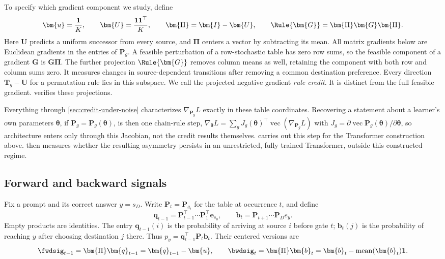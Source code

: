 To specify which gradient component we study, define
\begin{equation}
 \bm{u}=\frac{\mathbf1}{K},\qquad \bm{U}=\frac{\mathbf1\mathbf1^\top}{K},\qquad
 \bm{\Pi}=\bm{I}-\bm{U},\qquad \Rule{\bm{G}}=\bm{\Pi} \bm{G}\bm{\Pi} .
 \label{eq:credit-coordinates}
\end{equation}
Here $\bm{U}$ predicts a uniform successor from every source, and $\bm{\Pi}$ centers a
vector by subtracting its mean. All matrix gradients below are Euclidean
gradients in the entries of $\bm{P}_g$. A feasible perturbation of a row-stochastic
table has zero row sums, so the feasible component of a gradient $\bm{G}$ is $\bm{G}\bm{\Pi}$.
The further projection $\Rule{\bm{G}}$ removes column means as well, retaining the
component with both row and column sums zero. It measures changes in
source-dependent transitions after removing a common destination preference.
Every direction $\bm{T}_g-\bm{U}$ for a permutation rule lies in this subspace. We call
the projected negative gradient \emph{rule credit}. It is distinct from the
full feasible gradient.  verifies these projections.

Everything through \cref{sec:credit-under-noise} characterizes
$\nabla_{\bm{P}_g}L$ exactly in these table coordinates. Recovering a
statement about a learner's own parameters $\bm\theta$, if
$\bm{P}_g=\bm{P}_g(\bm\theta)$, is then one chain-rule step,
$\nabla_{\bm\theta}L=\sum_g J_g(\bm\theta)^\top\operatorname{vec}(\nabla_{\bm{P}_g}L)$
with $J_g=\partial\operatorname{vec}\bm{P}_g(\bm\theta)/\partial\bm\theta$, so
architecture enters only through this Jacobian, not the credit results
themselves.  carries out this step for
the Transformer construction above.  then
measures whether the resulting asymmetry persists in an unrestricted,
fully trained Transformer, outside this constructed regime.

\subsection{Forward and backward signals}

Fix a prompt and its correct answer $y=s_D$. Write $\bm{P}_t=\bm{P}_{g_t}$ for the table
at occurrence $t$, and define
\begin{equation}
 \bm{q}_{t-1}=\bm{P}_{t-1}^{\top}\cdots \bm{P}_1^{\top}\bm{e}_{s_0},
 \qquad \bm{b}_t=\bm{P}_{t+1}\cdots \bm{P}_De_y .
 \label{eq:forward-backward}
\end{equation}
Empty products are identities. The entry $\bm{q}_{t-1}(i)$ is the probability of
arriving at source $i$ before gate $t$; $\bm{b}_t(j)$ is the probability of reaching
$y$ after choosing destination $j$ there. Thus $p_y=\bm{q}_{t-1}^\top \bm{P}_t\bm{b}_t$.
Their centered versions are
\begin{equation}
 \fwdsig_{t-1}=\bm{\Pi} \bm{q}_{t-1}=\bm{q}_{t-1}-\bm{u},
 \qquad
 \bwdsig_t=\bm{\Pi} \bm{b}_t=\bm{b}_t-\operatorname{mean}(\bm{b}_t)\mathbf1 .
 \label{eq:centered-signals}
\end{equation}

